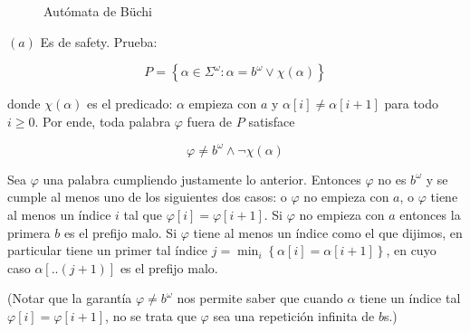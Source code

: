 \documentclass[a4paper, 12pt]{article}
\begin{document}
\begin{figure}[h!]
\centering


\caption{Autómata de Büchi}
\end{figure}

$(a)$ Es de safety. Prueba: 

\begin{equation*}
    P = \left\{ \alpha \in \Sigma^\omega : \alpha = b^\omega \lor \chi(\alpha) \right\} 
\end{equation*}

donde $\chi(\alpha)$ es el predicado: $\alpha$ empieza con $a$ y $\alpha[i] \neq
\alpha[i+1]$ para todo $i \geq 0$. Por ende, toda palabra $\varphi$ fuera de $P$
satisface 

\begin{equation*}
    \varphi \neq b^\omega \land \neg \chi(\alpha) 
\end{equation*}

Sea $\varphi$ una palabra cumpliendo justamente lo anterior. Entonces $\varphi$
no es $b^\omega$ y se cumple al menos uno de los siguientes dos casos: o
$\varphi$ no empieza con $a$, o $\varphi$ tiene al menos un índice $i$ tal que
$\varphi[i] = \varphi[i+1]$. Si $\varphi$ no empieza con $a$ entonces la primera
$b$ es el prefijo malo. Si $\varphi$ tiene al menos un índice como el que
dijimos, en particular tiene un primer tal índice $j = \min_i \left\{ \alpha[i]
= \alpha[i+1]\right\} $, en cuyo caso $\alpha[..(j+1)]$ es el prefijo malo. 

(Notar que la garantía $\varphi \neq b^\omega$ nos permite saber que cuando
$\alpha$ tiene un índice tal $\varphi[i] = \varphi[i+1]$, no se trata que
$\varphi$ sea una repetición infinita de $b$s.)
\end{document}
